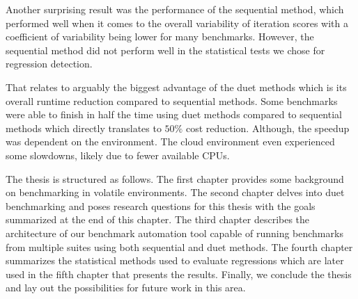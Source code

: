 Another surprising result was the performance of the sequential method, which performed well when it comes to the overall variability of iteration scores with a coefficient of variability being lower for many benchmarks.
However, the sequential method did not perform well in the statistical tests we chose for regression detection.

That relates to arguably the biggest advantage of the duet methods which is its overall runtime reduction compared to sequential methods.
Some benchmarks were able to finish in half the time using duet methods compared to sequential methods which directly translates to $50\%$ cost reduction.
Although, the speedup was dependent on the environment.
The cloud environment even experienced some slowdowns, likely due to fewer available CPUs.

The thesis is structured as follows.
The first chapter provides some background on benchmarking in volatile environments.
The second chapter delves into duet benchmarking and poses research questions for this thesis with the goals summarized at the end of this chapter.
The third chapter describes the architecture of our benchmark automation tool capable of running benchmarks from multiple suites using both sequential and duet methods.
The fourth chapter summarizes the statistical methods used to evaluate regressions which are later used in the fifth chapter that presents the results.
Finally, we conclude the thesis and lay out the possibilities for future work in this area.

